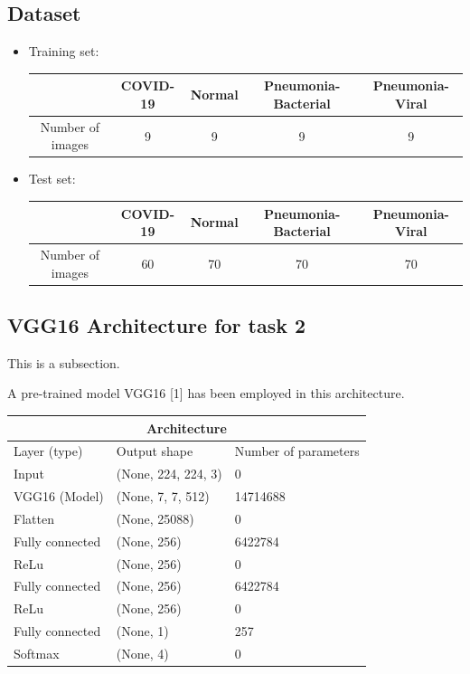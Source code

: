 \documentclass[a4paper,12pt]{article}
\begin{document}
\subsection{Dataset}

\begin{itemize}
  \item Training set: \\
   \begin{tabular}{ |c|c|c|c|c| }
    \hline
     & COVID-19 & Normal &  Pneumonia-Bacterial & Pneumonia-Viral\\
    \hline
    Number of images   & 9 & 9 & 9 & 9 \\
    \hline 
  \end{tabular}

  \item Test set: \\
  \begin{tabular}{ |c|c|c|c|c| }
    \hline
     & COVID-19 & Normal &  Pneumonia-Bacterial & Pneumonia-Viral\\
    \hline
    Number of images   & 60 & 70 & 70 & 70 \\
    \hline
  
  \end{tabular}
\end{itemize}


\subsection{VGG16 Architecture for task 2}
This is a subsection.

A pre-trained model VGG16 [1] has been employed in this architecture. \\


\begin{tabular}{|p{4cm}|p{4cm}|p{4cm}|}
  
  \hline
  \multicolumn{3}{|c|}{Architecture} \\
  \hline
  Layer (type) & Output shape & Number of parameters \\
  \hline
  Input              & (None, 224, 224, 3)& 0 \\
  VGG16 (Model)      & (None, 7, 7, 512)  & 14714688 \\
  Flatten            & (None, 25088)      & 0   \\
  Fully connected    & (None, 256)        & 6422784 \\
  ReLu               & (None, 256)        & 0 \\
  Fully connected    & (None, 256)        & 6422784 \\
  ReLu               & (None, 256)        & 0 \\
  Fully connected    & (None, 1)          & 257\\
  Softmax            & (None, 4)          & 0 \\
  \hline
\end{tabular}
\end{document}
